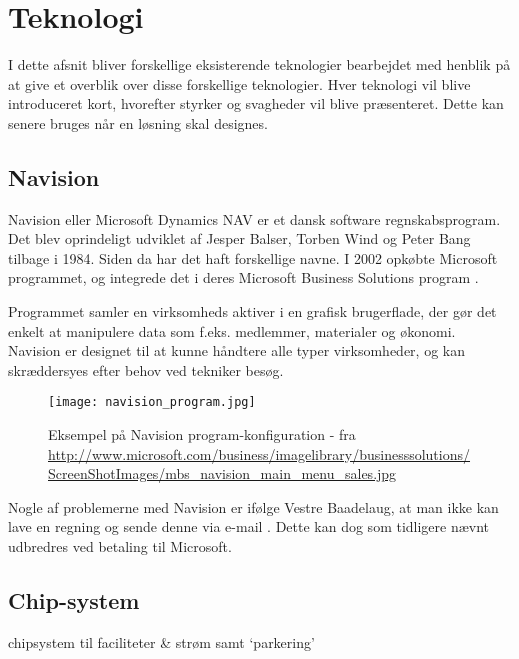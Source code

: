 \section{Teknologi} %
\label{sec:Teknologi}

I dette afsnit bliver forskellige eksisterende teknologier bearbejdet med henblik på at give et overblik over disse forskellige teknologier. Hver teknologi vil blive introduceret kort, hvorefter styrker og svagheder vil blive præsenteret. Dette kan senere bruges når en løsning skal designes.


\subsection{Navision} %
\label{sub:Navision}

Navision eller Microsoft Dynamics NAV er et dansk software regnskabsprogram. Det blev oprindeligt udviklet af Jesper Balser, Torben Wind og Peter Bang tilbage i 1984. Siden da har det haft forskellige navne. I 2002 opkøbte Microsoft programmet, og integrede det i deres Microsoft Business Solutions program \cite{visiondata}.

Programmet samler en virksomheds aktiver i en grafisk brugerflade, der gør det enkelt at manipulere data som f.eks. medlemmer, materialer og økonomi. Navision er designet til at kunne håndtere alle typer virksomheder, og kan skræddersyes efter behov ved tekniker besøg.

\begin{figure}
  \centering
  \texttt{[image: navision\_program.jpg]}
  \caption{Eksempel på Navision program-konfiguration - fra \url{http://www.microsoft.com/business/imagelibrary/businesssolutions/ScreenShotImages/mbs_navision_main_menu_sales.jpg}}
  \label{fig:navision_program}
\end{figure}


Nogle af problemerne med Navision er ifølge Vestre Baadelaug, at man ikke kan lave en regning og sende denne via e-mail \cite{int_vb_sl}. Dette kan dog som tidligere nævnt udbredres ved betaling til Microsoft.


\subsection{Chip-system} %
\label{sub:Chip}


chipsystem til faciliteter \& strøm samt `parkering'

